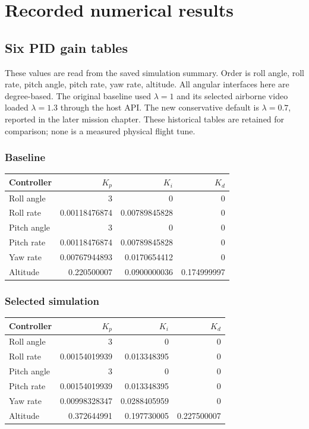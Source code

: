 \chapter{Recorded numerical results}
\section{Six PID gain tables}
These values are read from the saved simulation summary. Order is
roll angle, roll rate, pitch angle, pitch rate, yaw rate, altitude. All
angular interfaces here are degree-based. The original baseline used $\lambda=1$ and its selected airborne video loaded
$\lambda=1.3$ through the host API. The new conservative default is
$\lambda=0.7$, reported in the later mission chapter. These historical tables
are retained for comparison; none is a measured physical flight tune.

\subsection{Baseline}
\begin{center}\begin{tabular}{lrrr}\toprule Controller & $K_p$ & $K_i$ & $K_d$\\\midrule
Roll angle & 3 & 0 & 0\\
Roll rate & 0.00118476874 & 0.00789845828 & 0\\
Pitch angle & 3 & 0 & 0\\
Pitch rate & 0.00118476874 & 0.00789845828 & 0\\
Yaw rate & 0.00767944893 & 0.0170654412 & 0\\
Altitude & 0.220500007 & 0.0900000036 & 0.174999997\\
\bottomrule\end{tabular}\end{center}

\subsection{Selected simulation}
\begin{center}\begin{tabular}{lrrr}\toprule Controller & $K_p$ & $K_i$ & $K_d$\\\midrule
Roll angle & 3 & 0 & 0\\
Roll rate & 0.00154019939 & 0.013348395 & 0\\
Pitch angle & 3 & 0 & 0\\
Pitch rate & 0.00154019939 & 0.013348395 & 0\\
Yaw rate & 0.00998328347 & 0.0288405959 & 0\\
Altitude & 0.372644991 & 0.197730005 & 0.227500007\\
\bottomrule\end{tabular}\end{center}
